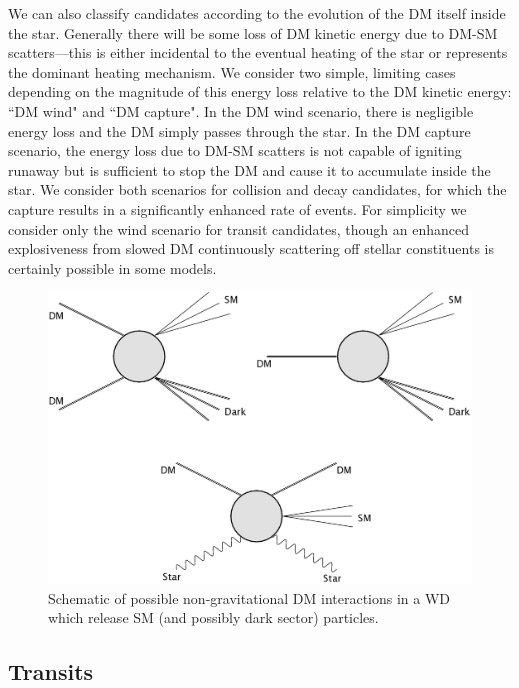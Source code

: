 \documentclass[twocolumn, preprintnumbers,amsmath,amssymb,prd, superscriptaddress]{revtex4}
\begin{document}
We can also classify candidates according to the evolution of the DM itself inside the star.
Generally there will be some loss of DM kinetic energy due to DM-SM scatters---this is either incidental to the eventual heating of the star or represents the dominant heating mechanism.
We consider two simple, limiting cases depending on the magnitude of this energy loss relative to the DM kinetic energy: ``DM wind" and ``DM capture".
In the DM wind scenario, there is negligible energy loss and the DM simply passes through the star.
In the DM capture scenario, the energy loss due to DM-SM scatters is not capable of igniting runaway but is sufficient to stop the DM and cause it to accumulate inside the star. 
We consider both scenarios for collision and decay candidates, for which the capture results in a significantly enhanced rate of events. 
For simplicity we consider only the wind scenario for transit candidates, though an enhanced explosiveness from slowed DM continuously scattering off stellar constituents is certainly possible in some models.

\begin{figure}
\includegraphics[scale=0.09]{feynmandiag.jpg}
\caption{Schematic of possible non-gravitational DM interactions in a WD which release SM (and possibly dark sector) particles.}
\label{fig:feynman}
\end{figure}

\subsection{Transits}
\end{document}
